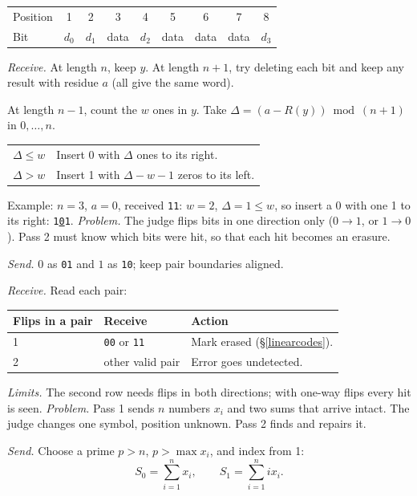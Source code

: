 {\par\begin{tabular}{@{}l*{8}{c}@{}}
Position & 1 & 2 & 3 & 4 & 5 & 6 & 7 & 8 \\
Bit & $d_0$ & $d_1$ & data & $d_2$ & data & data & data & $d_3$ \\
\end{tabular}\par
\textit{Receive.} At length $n$, keep $y$. At length $n+1$, try deleting each bit and keep any result with residue $a$ (all give the same word).
\par At length $n-1$, count the $w$ ones in $y$. Take $\Delta=(a-R(y))\bmod(n+1)$ in $0,\ldots,n$.
\par\begin{tabular}{@{}ll@{}}
$\Delta\le w$ & Insert 0 with $\Delta$ ones to its right. \\
$\Delta>w$ & Insert 1 with $\Delta-w-1$ zeros to its left. \\
\end{tabular}\par
Example: $n=3$, $a=0$, received \texttt{11}: $w=2$, $\Delta=1\le w$, so insert a 0 with one 1 to its right: \texttt{1\underline{0}1}.
\textit{Problem.} The judge flips bits in one direction only ($0\to1$, or $1\to0$). Pass 2 must know which bits were hit, so that each hit becomes an erasure.
\par\textit{Send.} $0$ as \texttt{01} and $1$ as \texttt{10}; keep pair boundaries aligned.
\par\textit{Receive.} Read each pair:
\par\begin{tabular}{@{}lll@{}}
\toprule
Flips in a pair & Receive & Action \\
\midrule
1 & \texttt{00} or \texttt{11} & Mark erased (\S\ref{linearcodes}). \\
2 & other valid pair & Error goes undetected. \\
\bottomrule
\end{tabular}\par
\textit{Limits.} The second row needs flips in both directions; with one-way flips every hit is seen.
\textit{Problem.} Pass 1 sends $n$ numbers $x_i$ and two sums that arrive intact. The judge changes one symbol, position unknown. Pass 2 finds and repairs it.
\par\textit{Send.} Choose a prime $p>n$, $p>\max x_i$, and index from 1:
\[ S_0=\sum_{i=1}^{n}x_i,\qquad S_1=\sum_{i=1}^{n}i x_i. \]
}
